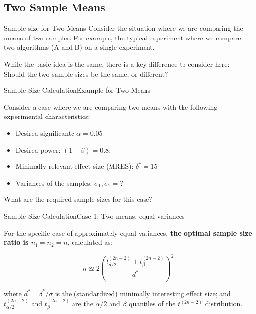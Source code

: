 
\subsection{Two Sample Means}

\begin{frame}{Sample size for Two Means}
  Consider the situation where we are comparing the means of two
  samples. For example, the typical experiment where we compare two
  algorithms (A and B) on a single experiment.\bigskip

  While the basic idea is the same, there is a key difference to
  consider here: Should the two sample sizes be the same, or
  different?
\end{frame}


\begin{frame}{Sample Size Calculation}{Example for Two Means}

Consider a case where we are comparing two means with the following
experimental characteristics:\bigskip

\begin{itemize}
  \item Desired significante $\alpha = 0.05$
  \item Desired power: $(1-\beta) = 0.8$;
  \item Minimally relevant effect size (MRES): $\delta^* = 15$
  \item Variances of the samples: $\sigma_1, \sigma_2 = ?$
\end{itemize}\bigskip

What are the required sample sizes for this case?
\end{frame}

\begin{frame}{Sample Size Calculation}{Case 1: Two means, equal variances}

For the specific case of approximately equal variances, {\bf the optimal
sample size ratio is $n_1 = n_2 = n$}, calculated as:

\begin{equation*}
n \approxeq 2\left(\frac{t^{(2n-2)}_{\alpha/2}+t^{(2n-2)}_{\beta}}{d^*}\right)^2
\end{equation*}

where $d^* = \delta^*/\sigma$ is the (standardized) minimally
interesting effect size; and $t^{(2n-2)}_{\alpha/2}$ and
$t^{(2n-2)}_{\beta}$ are the $\alpha/2$ and $\beta$ quantiles of the
$t^{(2n-2 )}$ distribution.\bigskip
\end{frame}

